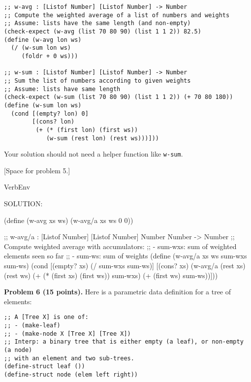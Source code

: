 \documentclass[12pt]{article}
\begin{document}
\begin{verbatim}
;; w-avg : [Listof Number] [Listof Number] -> Number
;; Compute the weighted average of a list of numbers and weights
;; Assume: lists have the same length (and non-empty)
(check-expect (w-avg (list 70 80 90) (list 1 1 2)) 82.5)
(define (w-avg lon ws)
  (/ (w-sum lon ws) 
     (foldr + 0 ws)))

;; w-sum : [Listof Number] [Listof Number] -> Number
;; Sum the list of numbers according to given weights
;; Assume: lists have same length
(check-expect (w-sum (list 70 80 90) (list 1 1 2)) (+ 70 80 180))
(define (w-sum lon ws)
  (cond [(empty? lon) 0]
        [(cons? lon)
         (+ (* (first lon) (first ws))
            (w-sum (rest lon) (rest ws)))]))
\end{verbatim}

\noindent
Your solution should not need a helper function like {\tt w-sum}.

\newpage

[Space for problem 5.]

\begin{SaveVerbatim}{VerbEnv}


SOLUTION:

(define (w-avg xs ws) (w-avg/a xs ws 0 0))

;; w-avg/a : [Listof Number] [Listof Number] Number Number -> Number
;; Compute weighted average with accumulators:
;;  - sum-wxs: sum of weighted elements seen so far
;;  - sum-ws: sum of weights
(define (w-avg/a xs ws sum-wxs sum-ws)
  (cond [(empty? xs) (/ sum-wxs sum-ws)]
        [(cons? xs)
         (w-avg/a (rest xs) 
                  (rest ws)
                  (+ (* (first xs) (first ws)) sum-wxs)
                  (+ (first ws) sum-ws))]))
\end{SaveVerbatim}




\newpage 
\noindent
{\bf Problem 6 (15 points).}
%
Here is a parametric data definition for a tree of elements:
\begin{verbatim}
;; A [Tree X] is one of:
;; - (make-leaf)
;; - (make-node X [Tree X] [Tree X])
;; Interp: a binary tree that is either empty (a leaf), or non-empty (a node)
;; with an element and two sub-trees.
(define-struct leaf ())
(define-struct node (elem left right))
\end{verbatim}
\end{document}
